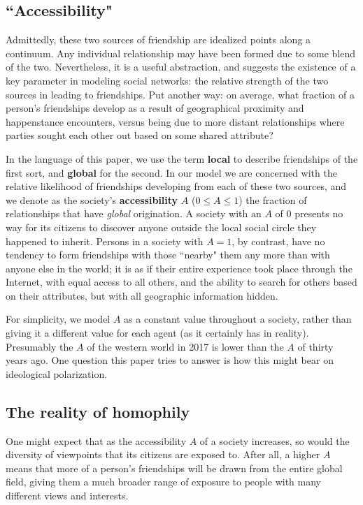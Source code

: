 \subsection{``Accessibility"}

Admittedly, these two sources of friendship are idealized points along a
continuum. Any individual relationship may have been formed due to some blend
of the two. Nevertheless, it is a useful abstraction, and suggests the
existence of a key parameter in modeling social networks: the relative
strength of the two sources in leading to friendships. Put another way: on
average, what fraction of a person's friendships develop as a result of
geographical proximity and happenstance encounters, versus being due to more
distant relationships where parties sought each other out based on some shared
attribute? 

In the language of this paper, we use the term \textbf{local} to describe
friendships of the first sort, and \textbf{global} for the second. In our
model we are concerned with the relative likelihood of friendships developing
from each of these two sources, and we denote as the society's
\textbf{accessibility} $A$ ($0 \leq A \leq 1$) the fraction of relationships
that have \textit{global} origination. A society with an $A$ of 0 presents no
way for its citizens to discover anyone outside the local social circle they
happened to inherit. Persons in a society with $A=1$, by contrast, have no
tendency to form friendships with those ``nearby" them any more than with
anyone else in the world; it is as if their entire experience took place
through the Internet, with equal access to all others, and the ability to
search for others based on their attributes, but with all geographic
information hidden.

For simplicity, we model $A$ as a constant value throughout a society, rather
than giving it a different value for each agent (as it certainly has in
reality). Presumably the $A$ of the western world in 2017 is lower than the
$A$ of thirty years ago. One question this paper tries to answer is how this
might bear on ideological polarization.

\subsection{The reality of homophily}

One might expect that as the accessibility $A$ of a society increases, so
would the diversity of viewpoints that its citizens are exposed to. After all,
a higher $A$ means that more of a person's friendships will be drawn from the
entire global field, giving them a much broader range of exposure to people
with many different views and interests.

